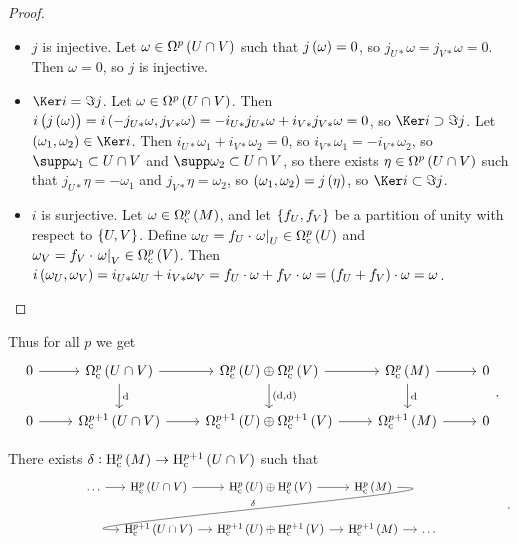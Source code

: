 \begin{proof}
\hfill
\begin{itemize}
\item $ j $ is injective. Let $ \omega \in \Omega^p\br{U \cap V} $ such that $ j\br{\omega} = 0 $, so $ j_{U*}\omega = j_{V*}\omega = 0 $. Then $ \omega = 0 $, so $ j $ is injective.
\item $ \Ker i = \Im j $. Let $ \omega \in \Omega^p\br{U \cap V} $. Then $ i\br{j\br{\omega}} = i\br{-j_{U*}\omega, j_{V*}\omega} = -i_{U*}j_{U*}\omega + i_{V*}j_{V*}\omega = 0 $, so $ \Ker i \supset \Im j $. Let $ \br{\omega_1, \omega_2} \in \Ker i $. Then $ i_{U*}\omega_1 + i_{V*}\omega_2 = 0 $, so $ i_{V*}\omega_1 = -i_{V*}\omega_2 $, so $ \supp \omega_1 \subset U \cap V $ and $ \supp \omega_2 \subset U \cap V $, so there exists $ \eta \in \Omega^p\br{U \cap V} $ such that $ j_{U*}\eta = -\omega_1 $ and $ j_{V*}\eta = \omega_2 $, so $ \br{\omega_1, \omega_2} = j\br{\eta} $, so $ \Ker i \subset \Im j $.
\item $ i $ is surjective. Let $ \omega \in \Omega_\c^p\br{M} $, and let $ \cbr{f_U, f_V} $ be a partition of unity with respect to $ \cbr{U, V} $. Define $ \omega_U = f_U \cdot \eval{\omega}_U \in \Omega_\c^p\br{U} $ and $ \omega_V = f_V \cdot \eval{\omega}_V \in \Omega_\c^p\br{V} $. Then $ i\br{\omega_U, \omega_V} = i_{U*}\omega_U + i_{V*}\omega_V = f_U \cdot \omega + f_V \cdot \omega = \br{f_U + f_V} \cdot \omega = \omega $.
\end{itemize}
\end{proof}

Thus for all $ p $ we get
$$
\begin{tikzcd}
0 \arrow{r} & \Omega_\c^p\br{U \cap V} \arrow{r} \arrow{d}{\d} & \Omega_\c^p\br{U} \oplus \Omega_\c^p\br{V} \arrow{r} \arrow{d}{\br{\d, \d}} & \Omega_\c^p\br{M} \arrow{r} \arrow{d}{\d} & 0 \\
0 \arrow{r} & \Omega_\c^{p + 1}\br{U \cap V} \arrow{r} & \Omega_\c^{p + 1}\br{U} \oplus \Omega_\c^{p + 1}\br{V} \arrow{r} & \Omega_\c^{p + 1}\br{M} \arrow{r} & 0
\end{tikzcd}.
$$

\begin{theorem}
There exists $ \delta : \H_\c^p\br{M} \to \H_\c^{p + 1}\br{U \cap V} $ such that
$$
\begin{tikzcd}[column sep=small]
\dots \arrow{r} & \H_\c^p\br{U \cap V} \arrow{r} & \H_\c^p\br{U} \oplus \H_\c^p\br{V} \arrow{r} & \H_\c^p\br{M} \arrow[in=180, out=0, swap]{dll}{\delta} & \\
& \H_\c^{p + 1}\br{U \cap V} \arrow{r} & \H_\c^{p + 1}\br{U} \oplus \H_\c^{p + 1}\br{V} \arrow{r} & \H_\c^{p + 1}\br{M} \arrow{r} & \dots
\end{tikzcd}.
$$
\end{theorem}

